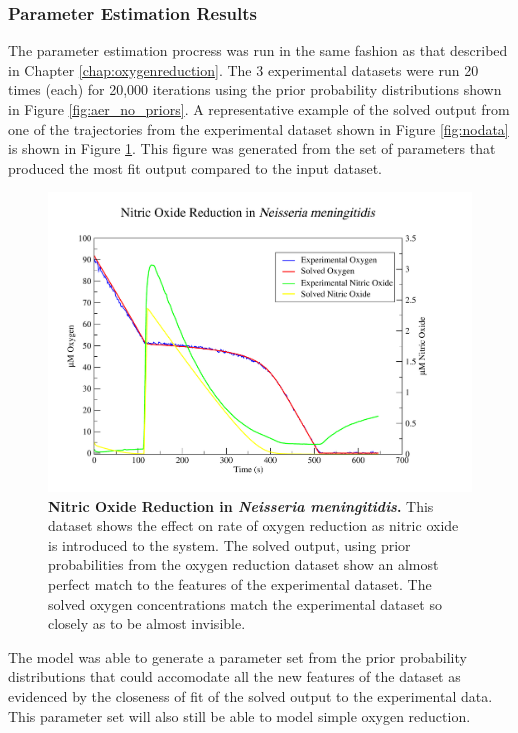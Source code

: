 \subsubsection{Parameter Estimation Results}
The parameter estimation procress was run in the same fashion as that described in Chapter \ref{chap:oxygenreduction}. The 3 experimental datasets were run 20 times (each) for 20,000 iterations using the prior probability distributions shown in Figure \ref{fig:aer_no_priors}. A representative example of the solved output from one of the trajectories from the experimental dataset shown in Figure \ref{fig:nodata} is shown in Figure \ref{fig:nosim}. This figure was generated from the set of parameters that produced the most fit output compared to the input dataset.
\begin{figure}[tbp]
 \centering
 \includegraphics[width=14cm, trim=2cm 1cm 4cm 1cm]{./06-noreduction/data/aer-no-sim.pdf}
 \caption[{Nitric Oxide Reduction in \textit{Neisseria meningitidis}.}]{{\bf Nitric Oxide Reduction in \textit{Neisseria meningitidis}.} This dataset shows the effect on rate of oxygen reduction as nitric oxide is introduced to the system. The solved output, using prior probabilities from the oxygen reduction dataset show an almost perfect match to the features of the experimental dataset. The solved oxygen concentrations match the experimental dataset so closely as to be almost invisible.}
 \label{fig:nosim}
\end{figure}
The model was able to generate a parameter set from the prior probability distributions that could accomodate all the new features of the dataset as evidenced by the closeness of fit of the solved output to the experimental data. This parameter set will also still be able to model simple oxygen reduction.
